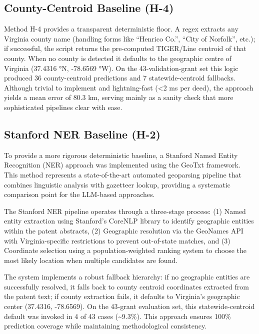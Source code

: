 \subsection{County-Centroid Baseline
(H-4)}\label{county-centroid-baseline-h-4}

Method H-4 provides a transparent deterministic floor. A regex extracts
any Virginia county name (handling forms like ``Henrico Co.'', ``City of
Norfolk'', etc.); if successful, the script returns the pre-computed
TIGER/Line centroid of that county. When no county is detected it
defaults to the geographic centre of Virginia (37.4316 °N, -78.6569 °W).
On the 43-validation-grant set this logic produced 36 county-centroid
predictions and 7 statewide-centroid fallbacks. Although trivial to
implement and lightning-fast (\textless2 ms per deed), the approach
yields a mean error of 80.3 km, serving mainly as a sanity check that
more sophisticated pipelines clear with ease.

\subsection{Stanford NER Baseline
(H-2)}\label{stanford-ner-baseline-h-2}

To provide a more rigorous deterministic baseline, a Stanford Named
Entity Recognition (NER) approach was implemented using the GeoTxt
framework. This method represents a state-of-the-art automated
geoparsing pipeline that combines linguistic analysis with gazetteer
lookup, providing a systematic comparison point for the LLM-based
approaches.

The Stanford NER pipeline operates through a three-stage process: (1)
Named entity extraction using Stanford's CoreNLP library to identify
geographic entities within the patent abstracts, (2) Geographic
resolution via the GeoNames API with Virginia-specific restrictions to
prevent out-of-state matches, and (3) Coordinate selection using a
population-weighted ranking system to choose the most likely location
when multiple candidates are found.

The system implements a robust fallback hierarchy: if no geographic
entities are successfully resolved, it falls back to county centroid
coordinates extracted from the patent text; if county extraction fails,
it defaults to Virginia's geographic center (37.4316, -78.6569). On the
43‑grant evaluation set, this statewide‑centroid default was invoked in
4 of 43 cases (\textasciitilde9.3\%). This approach ensures 100\%
prediction coverage while maintaining methodological consistency.

